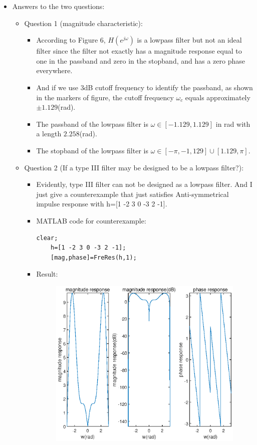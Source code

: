\documentclass[onecolumn,oneside]{SUSTechHomework}
\begin{document}
\begin{itemize}
    \item Answers to the two questions:
    \begin{itemize}
        \item Question 1 (magnitude characteristic):
        \begin{itemize}
            \item According to Figure 6, $H(e^{j\omega})$ is a lowpass filter but not an ideal filter since the filter 
            not exactly has a magnitude response equal to one in the passband and zero in the stopband, and has a zero phase everywhere. 
            \item And if we use $3$dB cutoff frequency to identify the passband, 
            as shown in the markers of figure, the cutoff frequency $\omega_c$ equals approximately $\pm 1.129$(rad).
            \item The passband of the lowpass filter is $\omega \in [-1.129,1.129]$ in rad with a length $2.258$(rad).
            \item The stopband of the lowpass filter is $\omega \in [-\pi,-1,129]\cup[1.129,\pi]$.
        \end{itemize}
        \item Question 2 (If a type III filter may be designed to be a lowpass filter?):
        \begin{itemize}
            \item Evidently, type III filter can not be designed as a lowpass filter. And I just give a counterexample that just satisfies Anti-symmetrical impulse response with h=[1 -2 3 0 -3 2 -1].
            \item MATLAB code for counterexample:
\begin{lstlisting}[title=\textbf{q6\_3\_1b.m}]
    clear;
    h=[1 -2 3 0 -3 2 -1];
    [mag,phase]=FreRes(h,1);
\end{lstlisting}
        \item Result:
        \begin{figure}[H]
            \centering
            \includegraphics[width=170mm]{pictures/q6_3_1(c).eps}

\end{figure}
\end{itemize}
\end{itemize}
\end{itemize}
\end{document}
